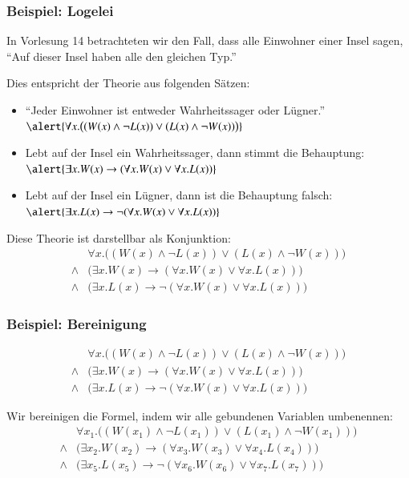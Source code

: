 \documentclass[onlymath]{beamer}
\begin{document}
\begin{frame}\frametitle{Beispiel: Logelei}

In Vorlesung 14 betrachteten wir den Fall, dass alle Einwohner einer Insel sagen,
"`Auf dieser Insel haben alle den gleichen Typ."'\bigskip

Dies entspricht der Theorie aus folgenden Sätzen:
\begin{itemize}
\item "`Jeder Einwohner ist entweder Wahrheitssager oder Lügner."'\\
	$\alert{\forall x.\big((W(x)\wedge\neg L(x))\vee (L(x)\wedge\neg W(x))\big)}$
\item Lebt auf der Insel ein Wahrheitssager, dann stimmt die Behauptung:\\
	$\alert{\exists x.W(x)\to(\forall x.W(x) \vee \forall x.L(x))}$
\item Lebt auf der Insel ein Lügner, dann ist die Behauptung falsch:\\
	$\alert{\exists x.L(x)\to\neg(\forall x.W(x) \vee \forall x.L(x))}$
\end{itemize}\medskip\pause

Diese Theorie ist darstellbar als Konjunktion:
\begin{align*}
& \forall x.\big((W(x)\wedge\neg L(x))\vee (L(x)\wedge\neg W(x))\big)\\
{}\wedge{} & \big(\exists x.W(x)\to(\forall x.W(x) \vee \forall x.L(x))\big) \\
{}\wedge{} & \big(\exists x.L(x)\to\neg(\forall x.W(x) \vee \forall x.L(x))\big)
\end{align*}


\end{frame}

\begin{frame}\frametitle{Beispiel: Bereinigung}

\begin{align*}
& \forall x.\big((W(x)\wedge\neg L(x))\vee (L(x)\wedge\neg W(x))\big)\\
{}\wedge{} & \big(\exists x.W(x)\to(\forall x.W(x) \vee \forall x.L(x))\big) \\
{}\wedge{} & \big(\exists x.L(x)\to\neg(\forall x.W(x) \vee \forall x.L(x))\big)
\end{align*}\pause

Wir bereinigen die Formel, indem wir alle gebundenen Variablen umbenennen:
\begin{align*}
& \forall x_1.\big((W(x_1)\wedge\neg L(x_1))\vee (L(x_1)\wedge\neg W(x_1))\big)\\
{}\wedge{} & \big(\exists x_2.W(x_2)\to(\forall x_3.W(x_3) \vee \forall x_4.L(x_4))\big) \\
{}\wedge{} & \big(\exists x_5.L(x_5)\to\neg(\forall x_6.W(x_6) \vee \forall x_7.L(x_7))\big)
\end{align*}

\end{frame}
\end{document}
